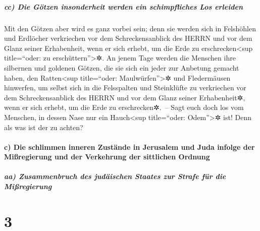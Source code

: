 \hypertarget{cc-die-guxf6tzen-insonderheit-werden-ein-schimpfliches-los-erleiden}{%
\subparagraph{cc) Die Götzen insonderheit werden ein schimpfliches Los
erleiden}\label{cc-die-guxf6tzen-insonderheit-werden-ein-schimpfliches-los-erleiden}}

Mit den Götzen aber wird es ganz vorbei sein;
denn sie werden sich in Felshöhlen und Erdlöcher
verkriechen vor dem Schreckensanblick des HERRN und vor dem Glanz seiner
Erhabenheit, wenn er sich erhebt, um die Erde zu
erschrecken\textless sup title=``oder: zu erschüttern''\textgreater✲.
An jenem Tage werden die Menschen ihre silbernen und
goldenen Götzen, die sie sich ein jeder zur Anbetung gemacht haben, den
Ratten\textless sup title=``oder: Maulwürfen''\textgreater✲ und
Fledermäusen hinwerfen, um selbst sich in die Felsspalten
und Steinklüfte zu verkriechen vor dem Schreckensanblick des HERRN und
vor dem Glanz seiner Erhabenheit✲, wenn er sich erhebt, um die Erde zu
erschrecken✲.~-- Sagt euch doch los vom Menschen, in
dessen Nase nur ein Hauch\textless sup title=``oder: Odem''\textgreater✲
ist! Denn als was ist der zu achten?

\hypertarget{c-die-schlimmen-inneren-zustuxe4nde-in-jerusalem-und-juda-infolge-der-miuxdfregierung-und-der-verkehrung-der-sittlichen-ordnung}{%
\paragraph{c) Die schlimmen inneren Zustände in Jerusalem und Juda
infolge der Mißregierung und der Verkehrung der sittlichen
Ordnung}\label{c-die-schlimmen-inneren-zustuxe4nde-in-jerusalem-und-juda-infolge-der-miuxdfregierung-und-der-verkehrung-der-sittlichen-ordnung}}

\hypertarget{aa-zusammenbruch-des-juduxe4ischen-staates-zur-strafe-fuxfcr-die-miuxdfregierung}{%
\subparagraph{aa) Zusammenbruch des judäischen Staates zur Strafe für
die
Mißregierung}\label{aa-zusammenbruch-des-juduxe4ischen-staates-zur-strafe-fuxfcr-die-miuxdfregierung}}

\hypertarget{section-2}{%
\section{3}\label{section-2}}

